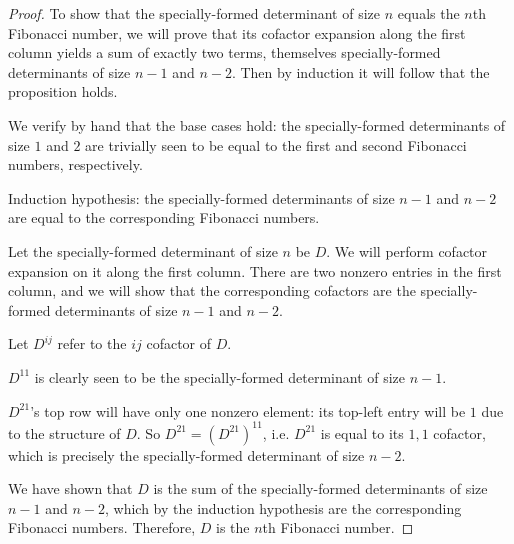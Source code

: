 \documentclass{article}
\begin{document}
\begin{proof}
    To show that the specially-formed determinant of size $n$ equals the $n$th
    Fibonacci number, we will prove that its cofactor expansion along the first
    column yields a sum of exactly two terms, themselves specially-formed
    determinants of size $n-1$ and $n-2$. Then by induction it will follow that
    the proposition holds.

    We verify by hand that the base cases hold: the specially-formed
    determinants of size $1$ and $2$ are trivially seen to be equal to the
    first and second Fibonacci numbers, respectively.

    Induction hypothesis: the specially-formed determinants of size $n-1$ and $n-2$
    are equal to the corresponding Fibonacci numbers.

    Let the specially-formed determinant of size $n$ be $D$. We will perform
    cofactor expansion on it along the first column. There are two nonzero
    entries in the first column, and we will show that the corresponding
    cofactors are the specially-formed determinants of size $n-1$ and $n-2$.

    Let $D^{ij}$ refer to the $ij$ cofactor of $D$.

    $D^11$ is clearly seen to be the specially-formed determinant of size
    $n-1$.

    $D^{21}$'s top row will have only one nonzero element: its top-left entry
    will be $1$ due to the structure of $D$. So $D^{21} = (D^{21})^{11}$, i.e.
    $D^{21}$ is equal to its $1,1$ cofactor, which is precisely the
    specially-formed determinant of size $n-2$.

    We have shown that $D$ is the sum of the specially-formed determinants of
    size $n-1$ and $n-2$, which by the induction hypothesis are the
    corresponding Fibonacci numbers.
    Therefore, $D$ is the $n$th Fibonacci number.
\end{proof}
\end{document}

